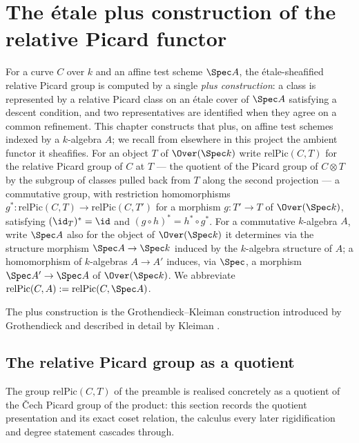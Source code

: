 \chapter{The \'etale plus construction of the relative Picard functor}
\label{chap:PicardEtale}

For a curve \(C\) over \(k\) and an affine test scheme \(\Spec A\), the \'etale-sheafified
relative Picard group is computed by a single \emph{plus construction}: a class is represented
by a relative Picard class on an \'etale cover of \(\Spec A\) satisfying a descent condition,
and two representatives are identified when they agree on a common refinement. This chapter
constructs that plus, on affine test schemes indexed by a \(k\)-algebra \(A\); we recall from
elsewhere in this project the ambient functor it sheafifies. For an object \(T\) of
\(\Over(\Spec k)\) write \(\mathrm{relPic}(C,T)\) for the relative Picard group of \(C\) at
\(T\) --- the quotient of the Picard group of \(C \otimes T\) by the subgroup of classes pulled
back from \(T\) along the second projection --- a commutative group, with restriction
homomorphisms \(g^{*} \colon \mathrm{relPic}(C,T) \to \mathrm{relPic}(C,T')\) for a morphism
\(g \colon T' \to T\) of \(\Over(\Spec k)\), satisfying \((\id_T)^{*} = \id\) and
\((g \circ h)^{*} = h^{*} \circ g^{*}\). For a commutative \(k\)-algebra \(A\), write \(\Spec A\)
also for the object of \(\Over(\Spec k)\) it determines via the structure morphism
\(\Spec A \to \Spec k\) induced by the \(k\)-algebra structure of \(A\); a homomorphism of
\(k\)-algebras \(A \to A'\) induces, via \(\Spec\), a morphism \(\Spec A' \to \Spec A\) of
\(\Over(\Spec k)\). We abbreviate \(\mathrm{relPic}(C,A) := \mathrm{relPic}(C,\Spec A)\).

The plus construction is the Grothendieck--Kleiman construction introduced by
Grothendieck \cite{grothendieck-fga} and described in detail by Kleiman
\cite{kleiman-picard}.

\section{The relative Picard group as a quotient}

The group \(\mathrm{relPic}(C,T)\) of the preamble is realised concretely as a quotient of
the \v Cech Picard group of the product: this section records the quotient presentation and
its exact coset relation, the calculus every later rigidification and degree statement
cascades through.

